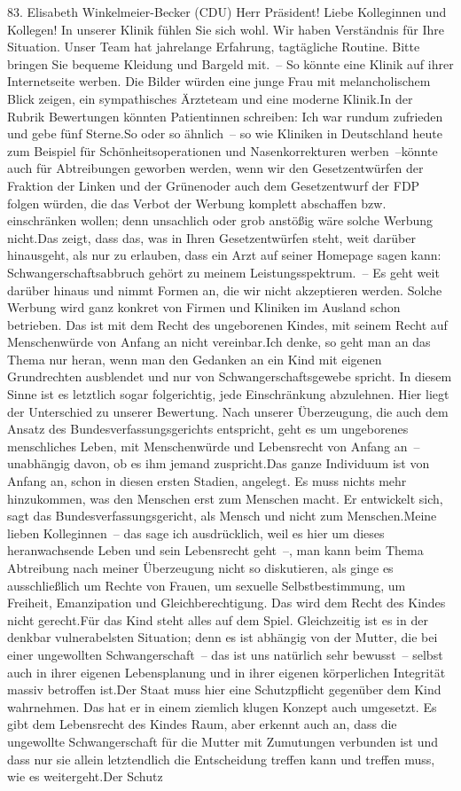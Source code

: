 \documentclass{article}
\begin{document}
	83. Elisabeth Winkelmeier-Becker (CDU) Herr Präsident! Liebe Kolleginnen und Kollegen! In unserer Klinik fühlen Sie sich wohl. Wir haben Verständnis für Ihre Situation. Unser Team hat jahrelange Erfahrung, tagtägliche Routine. Bitte bringen Sie bequeme Kleidung und Bargeld mit. – So könnte eine Klinik auf ihrer Internetseite werben. Die Bilder würden eine junge Frau mit melancholischem Blick zeigen, ein sympathisches Ärzteteam und eine moderne Klinik.In der Rubrik Bewertungen könnten Patientinnen schreiben: Ich war rundum zufrieden und gebe fünf Sterne.So oder so ähnlich – so wie Kliniken in Deutschland heute zum Beispiel für Schönheitsoperationen und Nasenkorrekturen werben –könnte auch für Abtreibungen geworben werden, wenn wir den Gesetzentwürfen der Fraktion der Linken und der Grünenoder auch dem Gesetzentwurf der FDP folgen würden, die das Verbot der Werbung komplett abschaffen bzw. einschränken wollen; denn unsachlich oder grob anstößig wäre solche Werbung nicht.Das zeigt, dass das, was in Ihren Gesetzentwürfen steht, weit darüber hinausgeht, als nur zu erlauben, dass ein Arzt auf seiner Homepage sagen kann: Schwangerschaftsabbruch gehört zu meinem Leistungsspektrum. – Es geht weit darüber hinaus und nimmt Formen an, die wir nicht akzeptieren werden. Solche Werbung wird ganz konkret von Firmen und Kliniken im Ausland schon betrieben. Das ist mit dem Recht des ungeborenen Kindes, mit seinem Recht auf Menschenwürde von Anfang an nicht vereinbar.Ich denke, so geht man an das Thema nur heran, wenn man den Gedanken an ein Kind mit eigenen Grundrechten ausblendet und nur von Schwangerschaftsgewebe spricht. In diesem Sinne ist es letztlich sogar folgerichtig, jede Einschränkung abzulehnen. Hier liegt der Unterschied zu unserer Bewertung. Nach unserer Überzeugung, die auch dem Ansatz des Bundesverfassungsgerichts entspricht, geht es um ungeborenes menschliches Leben, mit Menschenwürde und Lebensrecht von Anfang an – unabhängig davon, ob es ihm jemand zuspricht.Das ganze Individuum ist von Anfang an, schon in diesen ersten Stadien, angelegt. Es muss nichts mehr hinzukommen, was den Menschen erst zum Menschen macht. Er entwickelt sich, sagt das Bundesverfassungsgericht, als Mensch und nicht zum Menschen.Meine lieben Kolleginnen – das sage ich ausdrücklich, weil es hier um dieses heranwachsende Leben und sein Lebensrecht geht –, man kann beim Thema Abtreibung nach meiner Überzeugung nicht so diskutieren, als ginge es ausschließlich um Rechte von Frauen, um sexuelle Selbstbestimmung, um Freiheit, Emanzipation und Gleichberechtigung. Das wird dem Recht des Kindes nicht gerecht.Für das Kind steht alles auf dem Spiel. Gleichzeitig ist es in der denkbar vulnerabelsten Situation; denn es ist abhängig von der Mutter, die bei einer ungewollten Schwangerschaft – das ist uns natürlich sehr bewusst – selbst auch in ihrer eigenen Lebensplanung und in ihrer eigenen körperlichen Integrität massiv betroffen ist.Der Staat muss hier eine Schutzpflicht gegenüber dem Kind wahrnehmen. Das hat er in einem ziemlich klugen Konzept auch umgesetzt. Es gibt dem Lebensrecht des Kindes Raum, aber erkennt auch an, dass die ungewollte Schwangerschaft für die Mutter mit Zumutungen verbunden ist und dass nur sie allein letztendlich die Entscheidung treffen kann und treffen muss, wie es weitergeht.Der Schutz 
\end{document}
